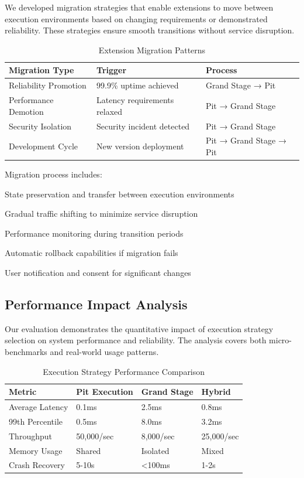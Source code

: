 We developed migration strategies that enable extensions to move between execution environments based on changing requirements or demonstrated reliability. These strategies ensure smooth transitions without service disruption.

\begin{table}[ht]
\centering
\begin{tabular}{@{}lll@{}}
\toprule
\textbf{Migration Type} & \textbf{Trigger} & \textbf{Process} \\
\midrule
Reliability Promotion & 99.9\% uptime achieved & Grand Stage → Pit \\
Performance Demotion & Latency requirements relaxed & Pit → Grand Stage \\
Security Isolation & Security incident detected & Pit → Grand Stage \\
Development Cycle & New version deployment & Pit → Grand Stage → Pit \\
\bottomrule
\end{tabular}
\caption{Extension Migration Patterns}
\end{table}

Migration process includes:

\begin{compactlist}
    \item State preservation and transfer between execution environments
    \item Gradual traffic shifting to minimize service disruption
    \item Performance monitoring during transition periods
    \item Automatic rollback capabilities if migration fails
    \item User notification and consent for significant changes
\end{compactlist}

\subsection*{Performance Impact Analysis}

Our evaluation demonstrates the quantitative impact of execution strategy selection on system performance and reliability. The analysis covers both micro-benchmarks and real-world usage patterns.

\begin{table}[ht]
\centering
\begin{tabular}{@{}llll@{}}
\toprule
\textbf{Metric} & \textbf{Pit Execution} & \textbf{Grand Stage} & \textbf{Hybrid} \\
\midrule
Average Latency & 0.1ms & 2.5ms & 0.8ms \\
99th Percentile & 0.5ms & 8.0ms & 3.2ms \\
Throughput & 50,000/sec & 8,000/sec & 25,000/sec \\
Memory Usage & Shared & Isolated & Mixed \\
Crash Recovery & 5-10s & <100ms & 1-2s \\
\bottomrule
\end{tabular}
\caption{Execution Strategy Performance Comparison}
\end{table}

